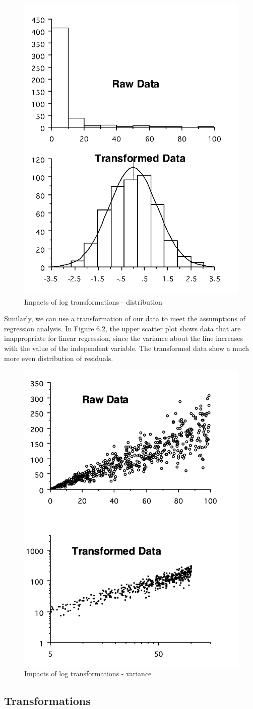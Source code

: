 \documentclass[
]{book}
\begin{document}
\begin{figure}
\includegraphics[width=0.4\linewidth]{figures/distributions} \caption{Impacts of log transformations - distribution}\label{fig:unnamed-chunk-66}
\end{figure}

Similarly, we can use a transformation of our data to meet the assumptions of regression analysis. In Figure 6.2, the upper scatter plot shows data that are inappropriate for linear regression, since the variance about the line increases with the value of the independent variable. The transformed data show a much more even distribution of residuals.

\begin{figure}
\includegraphics[width=0.4\linewidth]{figures/log_scatter} \caption{Impacts of log transformations - variance}\label{fig:unnamed-chunk-67}
\end{figure}

\subsection*{Transformations}\label{transformations}
\end{document}
